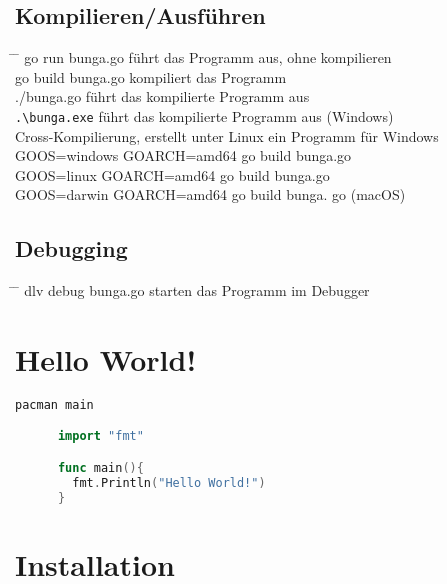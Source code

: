 \documentclass[twoside,a4paper,12pt]{article}
\begin{document}
\subsection{Kompilieren/Ausführen}
\begin{tabbing}
  \hspace{2mm} \= \hspace{50mm} \= \kill
  \> go run bunga.go \> führt das Programm aus, ohne kompilieren \\ 
  \> go build bunga.go \> kompiliert das Programm \\ 
  \> ./bunga.go \> führt das kompilierte Programm aus \\ 
  \> \verb|.\bunga.exe| \> führt das kompilierte Programm aus (Windows) \\
  \> Cross-Kompilierung, erstellt unter Linux ein Programm für Windows \\
  \> GOOS=windows GOARCH=amd64 go build bunga.go \\
  \> GOOS=linux GOARCH=amd64 go build bunga.go \\ 
  \> GOOS=darwin GOARCH=amd64 go build bunga. go (macOS)\\
\end{tabbing}
\subsection{Debugging}
\begin{tabbing}
  \hspace{2mm} \= \hspace{50mm} \= \kill
  \> dlv debug bunga.go \> starten das Programm im Debugger \\
\end{tabbing}

\newpage
\section{Hello World!}
\begin{center}
  \begin{minipage}{1.0\textwidth}
    \begin{lstlisting}[language=Go]
      pacman main

      import "fmt"

      func main(){
        fmt.Println("Hello World!")
      }
    \end{lstlisting}
  \end{minipage}
\end{center}

\section{Installation}
\end{document}
